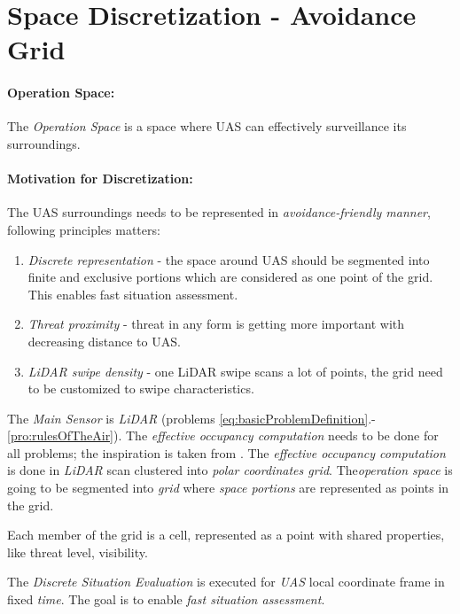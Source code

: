 \cleardoublepage
\section{Space Discretization - Avoidance Grid}\label{s:AvoidanceGrid}

\paragraph{Operation Space:} The \emph{Operation Space} is a space where UAS can effectively surveillance its surroundings.

\paragraph{Motivation for Discretization:} The UAS surroundings needs to be represented in \emph{avoidance-friendly manner}, following principles matters:

\begin{enumerate}
	\item \emph{Discrete representation} - the space around UAS should be segmented into finite and exclusive portions which are considered as one point of the grid. This enables fast situation assessment. 
	
	\item \emph{Threat proximity} - threat in any form is getting more important with decreasing distance to UAS.
	
	\item \emph{LiDAR swipe density} - one LiDAR swipe scans a lot of points, the grid need to be customized to swipe characteristics.
\end{enumerate}


The \emph{Main Sensor} is \emph{LiDAR} (problems \ref{eq:basicProblemDefinition}.-\ref{pro:rulesOfTheAir}).  The \emph{effective occupancy computation} needs to be done for all problems; the inspiration is taken from \cite{homm2010efficient}.  The \emph{effective occupancy computation} is done in \emph{LiDAR} scan  clustered into \emph{polar coordinates grid}. The\emph{operation space} is going to be segmented into \emph{grid} where \emph{space portions} are represented as points in the grid.

\begin{note}
	Each member of the grid is a cell, represented as a point with shared properties, like threat level, visibility.
\end{note}

The \emph{Discrete Situation Evaluation} is executed for \emph{UAS} local coordinate frame in fixed \emph{time}.  The goal is to enable \emph{fast situation assessment}. 


